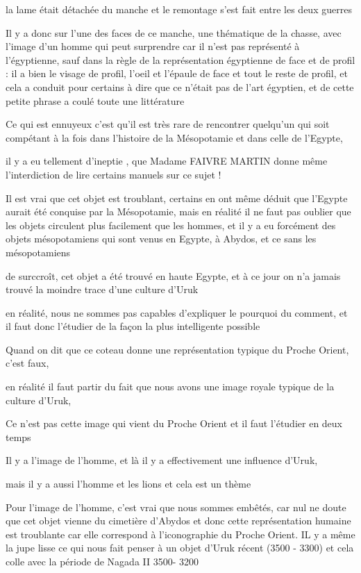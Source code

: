 \documentclass[a4paper,10pt]{article}
\begin{document}
la lame était détachée du manche et le remontage s'est
fait entre les deux guerres

Il y a donc sur l'une des faces de ce manche, une
thématique de la chasse, avec l'image
d'un homme qui peut surprendre car il
n'est pas représenté à l'égyptienne,
sauf dans la règle de la représentation égyptienne de face et de profil
: il a bien le visage de profil, l'oeil et
l'épaule  de face et tout le reste de profil, et cela
a conduit pour certains à dire que ce n'était pas de
l'art égyptien, et de cette petite phrase a coulé
toute une littérature

Ce qui est ennuyeux c'est qu'il est
très rare de rencontrer quelqu'un qui soit compétant à
la fois dans l'histoire de la Mésopotamie et dans
celle de l'Egypte, 

il y a eu tellement d'ineptie , que Madame FAIVRE
MARTIN donne même l'interdiction de lire certains
manuels sur ce sujet !

Il est vrai que cet objet est troublant, certains en ont même déduit que
l'Egypte aurait été conquise par la Mésopotamie, mais
en réalité il ne faut pas oublier que les objets circulent plus
facilement que les hommes, et il y a eu forcément des objets
mésopotamiens qui sont venus en Egypte, à Abydos, et ce sans les
mésopotamiens

de surccroît, cet objet a été trouvé en haute Egypte, et à ce jour on
n'a jamais trouvé la moindre trace
d'une culture d'Uruk

en réalité, nous ne sommes pas capables d'expliquer le
pourquoi du comment, et il faut donc l'étudier de la
façon la plus intelligente possible

Quand on dit que ce coteau donne une représentation typique du Proche
Orient, c'est faux, 

en réalité il faut partir du fait que nous avons une image royale
typique de la culture d'Uruk, 

Ce n'est pas cette image qui vient du Proche Orient et
il faut l'étudier en deux temps

Il y a l'image de l'homme, et là il y
a effectivement une influence d'Uruk, 

mais il y a aussi l'homme et les lions et cela est un
thème

Pour l'image de l'homme,
c'est vrai que nous sommes embêtés, car nul ne doute
que cet objet vienne du cimetière d'Abydos et donc
cette représentation humaine est troublante car elle correspond à
l'iconographie du Proche Orient. IL y a même la jupe
lisse ce qui nous fait penser à un objet d'Uruk récent
(3500 - 3300) et cela colle avec la période de Nagada II 3500- 3200
\end{document}
